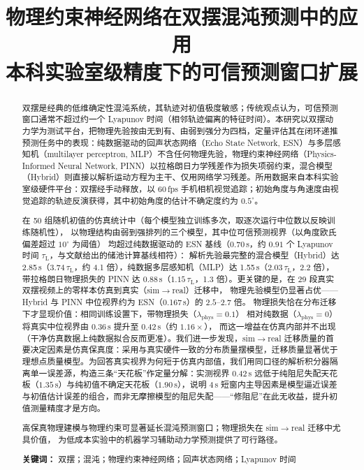 \documentclass[a4paper,12pt]{ctexart}   %
\title{物理约束神经网络在双摆混沌预测中的应用\\
       \large 本科实验室级精度下的可信预测窗口扩展}
\author{}
\date{}
\newcommand{\tauL}{\tau_{\mathrm{L}}}              %
\renewcommand{\emph}[1]{#1}
\begin{document}
\maketitle
\pagestyle{plain}   %

\begin{abstract}
{\setlength{\parindent}{0pt}\setlength{\parskip}{0.8em}
双摆是经典的低维确定性混沌系统，其轨迹对初值极度敏感；传统观点认为，可信预测窗口通常不超过约一个 Lyapunov 时间（相邻轨迹偏离的特征时间）。本研究以双摆动力学为测试平台，把物理先验按由无到有、由弱到强分为四档，定量评估其在闭环递推预测任务中的表现：纯数据驱动的回声状态网络（Echo State Network, ESN）与多层感知机（multilayer perceptron, MLP）不含任何物理先验，物理约束神经网络（Physics-Informed Neural Network, PINN）以拉格朗日力学残差作为损失项弱约束，混合模型（Hybrid）则直接以解析运动方程为主干、仅用网络学习残差。所用数据来自本科实验室级硬件平台：双摆经手动释放，以 60\,fps 手机相机视觉追踪；初始角度与角速度由视觉追踪的轨迹反演获得，其中初始角度的估计不确定度约为 $0.5^\circ$。

在 50 组随机初值的仿真统计中（每个模型独立训练多次，取逐次运行中位数以反映训练随机性），
以物理结构由弱到强排列的三个模型，其中位可信预测视界（以角度欧氏偏差超过 $10^\circ$ 为阈值）
均超过纯数据驱动的 ESN 基线（0.70\,s，约 $0.91$ 个 Lyapunov 时间 $\tauL$，与文献给出的储池计算基线相符）：
解析先验最完整的混合模型（Hybrid）达 2.85\,s（$3.74\,\tauL$，约 4.1 倍），纯数据多层感知机（MLP）达 1.55\,s（$2.03\,\tauL$，2.2 倍），
带拉格朗日物理损失的 PINN 达 0.88\,s（$1.15\,\tauL$，1.3 倍）。更关键的是，在 29 段真实双摆视频上的零样本仿真到真实（sim$\to$real）迁移中，
物理先验模型仍显著占优——Hybrid 与 PINN 中位视界约为 ESN（0.167\,s）的 $2.5\text{--}2.7$ 倍。
物理损失恰在分布迁移下才显现价值：相同训练设置下，带物理损失（$\lambda_{\mathrm{phys}}=0.1$）
相对纯数据（$\lambda_{\mathrm{phys}}=0$）将真实中位视界由 0.36\,s 提升至 0.42\,s（约 $1.16\times$），
而这一增益在仿真内部并不出现（干净仿真数据上纯数据拟合反而更准）。我们进一步发现，sim$\to$real 迁移质量的首要决定因素是仿真保真度：采用与真实硬件一致的\emph{分布质量}摆模型，迁移质量显著优于理想点质量模型。为回答真实视界为何短于仿真内部值，我们用同口径的解析积分器隔离单一误差源，构造三条“天花板”作定量分解：实测视界 $0.42$\,s 远低于纯阻尼失配天花板（$1.35$\,s）与纯初值不确定天花板（$1.90$\,s），说明 $4$\,s 短窗内主导因素是模型逼近误差与初值估计误差的组合，而非无摩擦模型的阻尼失配——“修阻尼”在此无收益，提升初值测量精度才是方向。

高保真物理建模与物理约束可显著延长混沌预测窗口；物理损失在 sim$\to$real 迁移中尤具价值，
为低成本实验中的机器学习辅助动力学预测提供了可行路径。

\textbf{关键词：} 双摆；混沌；物理约束神经网络；回声状态网络；Lyapunov 时间
\par}
\end{abstract}
\end{document}
